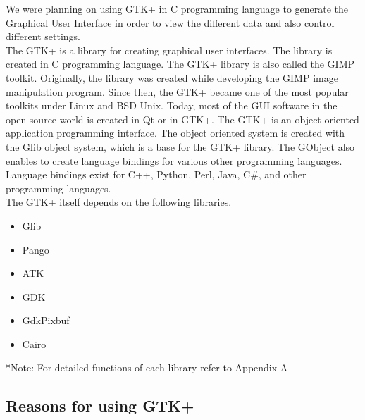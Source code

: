 \documentclass[12pt]{article}
\begin{document}
We were planning on using GTK+ in C programming language to generate the Graphical User Interface in order to view the different data and also control different settings.\\

The GTK+ is a library for creating graphical user interfaces. The library is created in C programming language. The GTK+ library is also called the GIMP toolkit. Originally, the library was created while developing the GIMP image manipulation program. Since then, the GTK+ became one of the most popular toolkits under Linux and BSD Unix. Today, most of the GUI software in the open source world is created in Qt or in GTK+. The GTK+ is an object oriented application programming interface. The object oriented system is created with the Glib object system, which is a base for the GTK+ library. The GObject also enables to create language bindings for various other programming languages. Language bindings exist for C++, Python, Perl, Java, C\#, and other programming languages.\\

The GTK+ itself depends on the following libraries.

\begin{itemize}

\item Glib
\item Pango
\item ATK
\item GDK
\item GdkPixbuf
\item Cairo



\end{itemize}

*Note: For detailed functions of each library refer to Appendix A




\subsection{Reasons for using GTK+}
\end{document}
